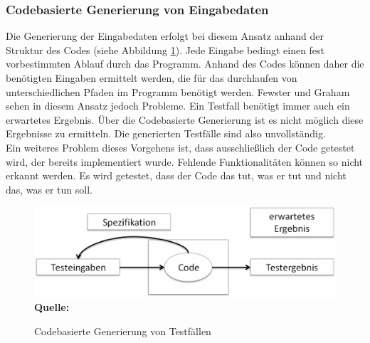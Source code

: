 \subsubsection{Codebasierte Generierung von Eingabedaten}
\label{subsubsec:codebasierte_generierung}
Die Generierung der Eingabedaten erfolgt bei diesem Ansatz anhand der Struktur des Codes (siehe Abbildung \ref{fig:codeBasedDesign}). Jede Eingabe bedingt einen fest vorbestimmten Ablauf durch das Programm. Anhand des Codes können daher die benötigten Eingaben ermittelt werden, die für das durchlaufen von unterschiedlichen Pfaden im Programm benötigt werden.
Fewster und Graham \cite[vgl. S. 19 ff.]{fewster_software_1999} sehen in diesem Ansatz jedoch Probleme. Ein Testfall benötigt immer auch ein erwartetes Ergebnis. Über die Codebasierte Generierung ist es nicht möglich diese Ergebnisse zu ermitteln. Die generierten Testfälle sind also unvollständig.\\
Ein weiteres Problem dieses Vorgehens ist, dass ausschließlich der Code getestet wird, der bereits implementiert wurde. Fehlende Funktionalitäten können so nicht erkannt werden. Es wird getestet, dass der Code das \grq tut, was er tut und nicht das, was er tun soll.\grq\ \cite[vgl. S. 20]{fewster_software_1999}
\begin{figure}[htb]
  \centering  
  \includegraphics[scale=0.6]{img/codeBasedDesign.png}\\
  \footnotesize\sffamily\textbf{Quelle:} \cite[vgl. S. 19]{fewster_software_1999}
  \caption{Codebasierte Generierung von Testfällen}
  \label{fig:codeBasedDesign}
\end{figure}


